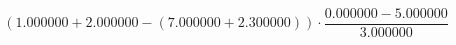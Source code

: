 \documentclass{article}
\begin{document}
$$(1.000000 + 2.000000 - (7.000000 + 2.300000)) \cdot \frac{0.000000 - 5.000000}{3.000000}$$
\end{document}
